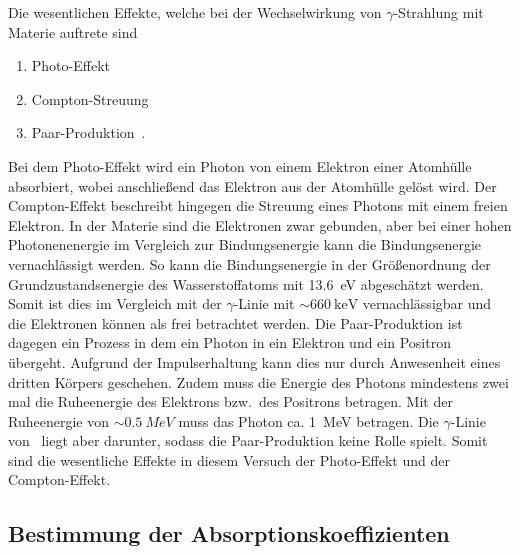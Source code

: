 Die wesentlichen Effekte, welche bei der Wechselwirkung von $\gamma$-Strahlung
mit Materie auftrete sind
\begin{enumerate}
  \item Photo-Effekt
  \item Compton-Streuung
  \item Paar-Produktion~.
\end{enumerate}
Bei dem Photo-Effekt wird ein Photon von einem Elektron einer Atomhülle
absorbiert, wobei anschließend das Elektron aus der Atomhülle gelöst wird.
Der Compton-Effekt beschreibt hingegen die Streuung eines Photons mit einem
freien Elektron. In der Materie sind die Elektronen zwar gebunden, aber bei
einer hohen Photonenenergie im Vergleich zur Bindungsenergie kann die
Bindungsenergie vernachlässigt werden. So kann die Bindungsenergie in der
Größenordnung der Grundzustandsenergie des Wasserstoffatoms mit \SI{13.6}{\eV}
abgeschätzt werden. Somit ist dies im Vergleich mit der $\gamma$-Linie mit
$\sim \SI{660}{\keV}$ vernachlässigbar und die Elektronen können als frei
betrachtet werden.
Die Paar-Produktion ist dagegen ein Prozess in dem ein Photon in ein Elektron
und ein Positron übergeht. Aufgrund der Impulserhaltung kann dies nur durch
Anwesenheit eines dritten Körpers geschehen. Zudem muss die Energie des Photons
mindestens zwei mal die Ruheenergie des Elektrons bzw.~des Positrons betragen.
Mit der Ruheenergie von $\sim \SI{0.5}{MeV}$ muss das Photon ca. \SI{1}{\MeV}
betragen. Die $\gamma$-Linie von \Cs~liegt aber darunter,
sodass die Paar-Produktion keine Rolle spielt.
Somit sind die wesentliche Effekte in diesem Versuch der Photo-Effekt und
der Compton-Effekt.

\subsection{Bestimmung der Absorptionskoeffizienten}
\label{sub:bestimmung_der_absorptionskoeffizienten}

